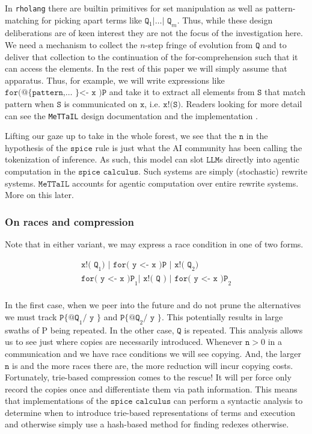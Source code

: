\documentclass{article}
\newcommand{\code}[1]{\texttt{#1}}
\begin{document}
In \code{rholang} there are builtin primitives for set manipulation as well as pattern-matching for picking apart terms like $\code{Q}_1 \code{|} \ldots \code{|  Q}_m$. Thus, while these design deliberations are of keen interest they are not the focus of the investigation here. We need a mechanism to collect the $n$-step fringe of evolution from $\code{Q}$ and to deliver that collection to the continuation of the for-comprehension such that it can access the elements. In the rest of this paper we will simply assume that apparatus. Thus, for example, we will write expressions like $\code{for(@\{ pattern,} \dots \code{ \} <- x )P}$ and take it to extract all elements from $\code{S}$ that match $\text{pattern}$ when $\code{S}$ is communicated on $\code{x}$, i.e. $\code{x!(S)}$. Readers looking for more detail can see the \code{MeTTaIL} design documentation and the implementation \cite{MeTTaILGithubRepo}.

Lifting our gaze up to take in the whole forest, we see that the $\code{n}$ in the hypothesis of the $\code{spice}$ rule is just what the AI community has been calling the tokenization of inference. As such, this model can slot $\code{LLM}$s directly into agentic computation in the $\code{spice calculus}$. Such systems are simply (stochastic) rewrite systems. $\code{MeTTaIL}$ accounts for agentic computation over entire rewrite systems. More on this later.

\subsubsection{On races and compression}

Note that in either variant, we may express a race condition in one of two forms.

\begin{align*}
  \code{x!( Q}_1 \code{) | for( y <- x )P | x!( Q}_2 \code{)} \\
  \code{for( y <- x )P}_1 \code{| x!( Q ) | for( y <- x )P}_2 \\
\end{align*}

In the first case, when we peer into the future and do not prune the alternatives we must track $\code{P\{ @Q}_1 \code{/ y \}}$ and $\code{P\{ @Q}_2 \code{/ y \}}$. This potentially results in large swaths of P being repeated. In the other case, $\code{Q}$ is repeated. This analysis allows us to see just where copies are necessarily introduced. Whenever $\code{n} > 0$ in a communication and we have race conditions we will see copying. And, the larger $\code{n}$ is and the more races there are, the more reduction will incur copying costs. Fortunately, trie-based compression comes to the rescue! It will per force only record the copies once and differentiate them via path information. This means that implementations of the $\code{spice calculus}$ can perform a syntactic analysis to determine when to introduce trie-based representations of terms \cite{DBLP:journals/corr/abs-2302-08775} and execution and otherwise simply use a hash-based method for finding redexes otherwise.
\end{document}

